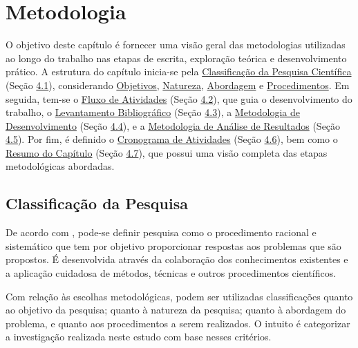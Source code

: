 \chapter[Metodologia]{Metodologia}
\label{chap:Metodologia}

O objetivo deste capítulo é fornecer uma visão geral das metodologias utilizadas ao longo do trabalho nas etapas de escrita, exploração teórica e desenvolvimento prático. A estrutura do capítulo inicia-se pela \hyperref[sec:Classificacao da Pesquisa]{Classificação da Pesquisa Científica} 
(Seção \hyperref[sec:Classificacao da Pesquisa]{4.1}), considerando \hyperref[sec:Objetivos2]{Objetivos}, \hyperref[sec:Natureza]{Natureza}, \hyperref[sec:Abordagem]{Abordagem} e \hyperref[sec:Procedimentos]{Procedimentos}. 
Em seguida, tem-se o \hyperref[sec:Fluxo de Atividades]{Fluxo de Atividades} (Seção \hyperref[sec:Fluxo de Atividades]{4.2}), que guia o desenvolvimento do trabalho, o \hyperref[sec:Levantamento Bibliografico]{Levantamento Bibliográfico} (Seção \hyperref[sec:Levantamento Bibliografico]{4.3}), 
a \hyperref[sec:Metodologia de Desenvolvimento]{Metodologia de Desenvolvimento} (Seção \hyperref[sec:Metodologia de Desenvolvimento]{4.4}), e a \hyperref[sec:Metodologia de Analise de Resultados]{Metodologia de Análise de Resultados} (Seção \hyperref[sec:Metodologia de Analise de Resultados]{4.5}). 
Por fim, é definido o \hyperref[sec:Cronograma]{Cronograma de Atividades} (Seção \hyperref[sec:Cronograma]{4.6}), bem como o \hyperref[sec:Resumo do Capitulo]{Resumo do Capítulo} (Seção \hyperref[sec:Resumo do Capitulo]{4.7}), que possui uma visão completa das etapas metodológicas abordadas.

\section{Classificação da Pesquisa}
\label{sec:Classificacao da Pesquisa}
De acordo com , pode-se definir pesquisa como o procedimento racional e sistemático que tem por objetivo proporcionar respostas aos problemas que são propostos. É desenvolvida através da colaboração 
dos conhecimentos existentes e a aplicação cuidadosa de métodos, técnicas e outros procedimentos científicos.

Com relação às escolhas metodológicas, podem ser utilizadas classificações quanto ao objetivo da pesquisa; quanto à natureza da pesquisa; quanto à abordagem do problema, e quanto aos procedimentos a serem realizados. O intuito é 
categorizar a investigação realizada neste estudo com base nesses critérios.

